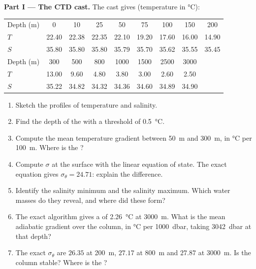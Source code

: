 \begin{problem}
\medskip
\noindent\textbf{Part I --- The CTD cast.} The cast gives (temperature in
\si{\celsius}):
\begin{center}
\small
\setlength{\tabcolsep}{3pt}
\begin{tabular}{|l|*{8}{c}|}
\hline
Depth (m) & 0 & 10 & 25 & 50 & 75 & 100 & 150 & 200 \\
$T$ & 22.40 & 22.38 & 22.35 & 22.10 & 19.20 & 17.60 & 16.00 & 14.90 \\
$S$ & 35.80 & 35.80 & 35.80 & 35.79 & 35.70 & 35.62 & 35.55 & 35.45 \\
\hline
Depth (m) & 300 & 500 & 800 & 1000 & 1500 & 2500 & 3000 & \\
$T$ & 13.00 & 9.60 & 4.80 & 3.80 & 3.00 & 2.60 & 2.50 & \\
$S$ & 35.22 & 34.82 & 34.32 & 34.36 & 34.60 & 34.89 & 34.90 & \\
\hline
\end{tabular}
\end{center}
\begin{enumerate}
  \item Sketch the profiles of temperature and salinity.
  \item Find the depth of the  with a threshold of \qty{0.5}{\celsius}.
  \item Compute the mean temperature gradient between \qty{50}{m} and
        \qty{300}{m}, in \si{\celsius} per \qty{100}{m}. Where is the
        ?
  \item Compute $\sigma$ at the surface with the linear equation of state. The
        exact equation gives $\sigma_\theta = 24.71$: explain the difference.
  \item Identify the salinity minimum and the salinity maximum. Which water masses
        do they reveal, and where did these form?
  \item The exact algorithm gives a  of
        \qty{2.26}{\celsius} at \qty{3000}{m}. What is the mean adiabatic
        gradient over the column, in \si{\celsius} per \qty{1000}{dbar}, taking
        \qty{3042}{dbar} at that depth?
  \item The exact $\sigma_\theta$ are $26.35$ at \qty{200}{m}, $27.17$ at
        \qty{800}{m} and $27.87$ at \qty{3000}{m}. Is the column stable? Where
        is the ?
\end{enumerate}


\end{problem}
